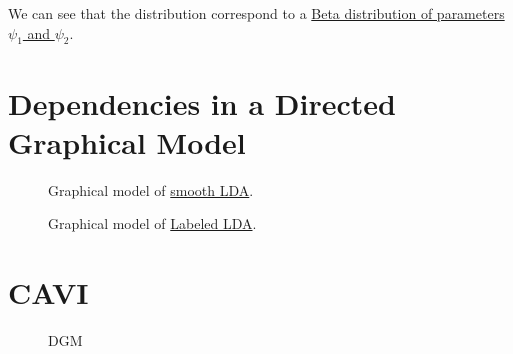 \documentclass{article}
\begin{document}
We can see that the distribution correspond to a \underline{Beta distribution of parameters $\psi_1$ and $\psi_2$}.

\section{Dependencies in a Directed Graphical Model}

\begin{figure}[H]
    \centering
    
    \caption{Graphical model of \href{https://www.jmlr.org/papers/volume3/blei03a/blei03a.pdf}{smooth LDA}.}
    \label{fig:fig1}
\end{figure}

\begin{figure}[H]
    \centering
    
    \caption{Graphical model of \href{https://aclanthology.org/D09-1026.pdf}{Labeled LDA}.}
    \label{fig:fig2}
\end{figure}

\section{CAVI}

\begin{figure}[H]
    \centering
    
    \caption{DGM}
    \label{fig:fig3}
\end{figure}
\end{document}
